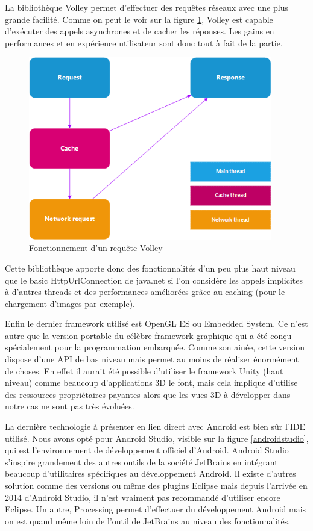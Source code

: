 La bibliothèque Volley permet d’effectuer des requêtes réseaux avec une plus grande facilité. Comme on peut le voir sur la figure \ref{volley}, Volley est capable d’exécuter des appels asynchrones et de cacher les réponses. Les gains en performances et en expérience utilisateur sont donc tout à fait de la partie.

\begin{figure}[H]
    \centering
    \includegraphics[height=8cm]{./img/volley.png}
    \caption{Fonctionnement d’un requête Volley}
    \label{volley}
\end{figure}

Cette bibliothèque apporte donc des fonctionnalités d’un peu plus haut niveau que le basic HttpUrlConnection de java.net si l’on considère les appels implicites à d’autres threads et des performances améliorées grâce au caching (pour le chargement d’images par exemple).

Enfin le dernier framework utilisé est OpenGL ES ou Embedded System. Ce n’est autre que la version portable du célèbre framework graphique qui a été conçu spécialement pour la programmation embarquée. Comme son ainée, cette version dispose d’une API de bas niveau mais permet au moins de réaliser énormément de choses. En effet il aurait été possible d’utiliser le framework Unity (haut niveau) comme beaucoup d’applications 3D le font, mais cela implique d’utilise des ressources propriétaires payantes alors que les vues 3D à développer dans notre cas ne sont pas très évoluées.

La dernière technologie à présenter en lien direct avec Android est bien sûr l’IDE utilisé. Nous avons opté pour Android Studio, visible sur la figure \ref{androidstudio}, qui est l’environnement de développement officiel d’Android. Android Studio s’inspire grandement des autres outils de la société JetBrains en intégrant beaucoup d’utilitaires spécifiques au développement Android. Il existe d’autres solution comme des versions ou même des plugins Eclipse mais depuis l’arrivée en 2014 d’Android Studio, il n’est vraiment pas recommandé d’utiliser encore Eclipse. Un autre, Processing permet d’effectuer du développement Android mais on est quand même loin de l’outil de JetBrains au niveau des fonctionnalités.

